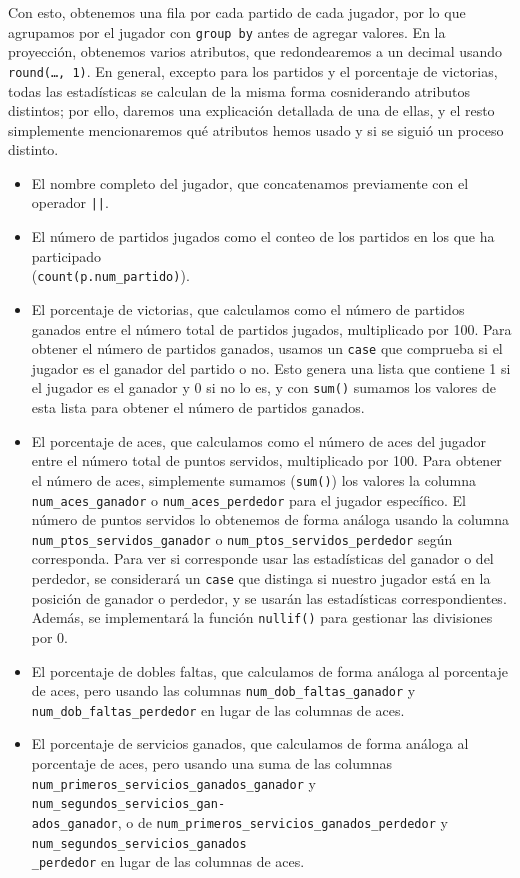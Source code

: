 Con esto, obtenemos una fila por cada partido de cada jugador, por lo que agrupamos por el jugador con \texttt{group by} antes de agregar valores. En la proyección, obtenemos varios atributos, que redondearemos a un decimal usando \texttt{round(\dots, 1)}. En general, excepto para los partidos y el porcentaje de victorias, todas las estadísticas se calculan de la misma forma cosniderando atributos distintos; por ello, daremos una explicación detallada de una de ellas, y el resto simplemente mencionaremos qué atributos hemos usado y si se siguió un proceso distinto.
\begin{itemize}
\item El nombre completo del jugador, que concatenamos previamente con el operador \texttt{||}.
\item El número de partidos jugados como el conteo de los partidos en los que ha participado \\ (\texttt{count(p.num\_partido)}).
\item El porcentaje de victorias, que calculamos como el número de partidos ganados entre el número total de partidos jugados, multiplicado por 100. Para obtener el número de partidos ganados, usamos un \texttt{case} que comprueba si el jugador es el ganador del partido o no. Esto genera una lista que contiene 1 si el jugador es el ganador y 0 si no lo es, y con \texttt{sum()} sumamos los valores de esta lista para obtener el número de partidos ganados. 
\item El porcentaje de aces, que calculamos como el número de aces del jugador entre el número total de puntos servidos, multiplicado por 100. Para obtener el número de aces, simplemente sumamos (\texttt{sum()}) los valores la columna \texttt{num\_aces\_ganador} o \texttt{num\_aces\_perdedor} para el jugador específico. El número de puntos servidos lo obtenemos de forma análoga usando la columna \texttt{num\_ptos\_servidos\_ganador} o \texttt{num\_ptos\_servidos\_perdedor} según corresponda. Para ver si corresponde usar las estadísticas del ganador o del perdedor, se considerará un \texttt{case} que distinga si nuestro jugador está en la posición de ganador o perdedor, y se usarán las estadísticas correspondientes. Además, se implementará la función \texttt{nullif()} para gestionar las divisiones por 0. 
\item El porcentaje de dobles faltas, que calculamos de forma análoga al porcentaje de aces, pero usando las columnas \texttt{num\_dob\_faltas\_ganador} y \texttt{num\_dob\_faltas\_perdedor} en lugar de las columnas de aces. 
\item El porcentaje de servicios ganados, que calculamos de forma análoga al porcentaje de aces, pero usando una suma de las columnas \texttt{num\_primeros\_servicios\_ganados\_ganador} y \texttt{num\_segundos\_servicios\_gan-}\\\texttt{ados\_ganador}, o de \texttt{num\_primeros\_servicios\_ganados\_perdedor} y \texttt{num\_segundos\_servicios\_ganados}\\\texttt{\_perdedor} en lugar de las columnas de aces.

\end{itemize}
